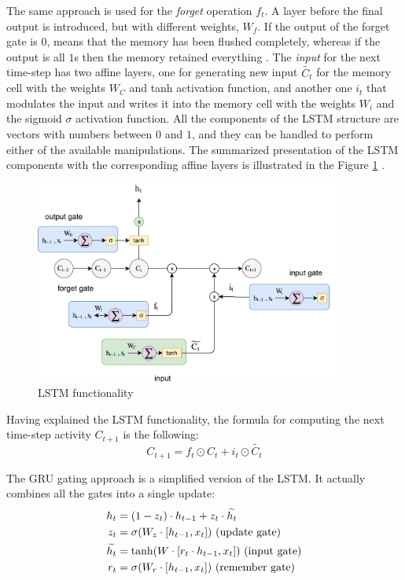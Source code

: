 The same approach is used for the \textit{forget} operation $f_{t}$. A layer before the final output is introduced, but with different weights, $W_{f}$. If the output of the forget gate is $0$, means that the memory has been flushed completely, whereas if the output is all $1$s then the memory retained everything \cite{NeonRNN}. The \textit{input} for the next time-step has two affine layers, one for generating new input $\widetilde{C_{t}}$ for the memory cell with the weights $W_{C}$ and tanh activation function, and another one $i_{t}$ that modulates the input and writes it into the memory cell with the weights $W_{i}$ and the sigmoid $\sigma$ activation function. All the components of the LSTM structure are vectors with numbers between $0$ and $1$, and they can be handled to perform either of the available manipulations. The summarized presentation of the LSTM components with the corresponding affine layers is illustrated in the Figure \ref{LSTMcore} \cite{NeonRNN}.
\begin{figure}[H]
	\centering
	\includegraphics[width=0.9\textwidth]{Figures/LSTM}
	\caption{LSTM functionality}
	\label{LSTMcore}
\end{figure}

Having explained the LSTM functionality, the formula for computing the next time-step activity $C_{t+1}$ is the following:
\begin{equation}\label{LSTM}
C_{t+1}=f_{t}\odot C_{t}+i_{t}\odot \widetilde{C_{t}}
\end{equation}

The GRU gating approach is a simplified version of the LSTM. It actually combines all the gates into a single update:
\begin{equation}\label{GRU}
\begin{aligned}
h_{t}&=(1-z_{t})\cdot h_{t-1}+z_{t}\cdot \widetilde{h_{t}}\\
z_{t}&=\sigma(W_{z}\cdot[h_{t-1},x_{t}]) \textup{ (update gate)}\\
\widetilde{h_{t}}&=\textup{tanh}(W\cdot[r_{t}\cdot h_{t-1},x_{t}]) \textup{ (input gate)}\\
r_{t}&=\sigma(W_{r}\cdot[h_{t-1},x_{t}]) \textup{ (remember gate)}
\end{aligned}
\end{equation}